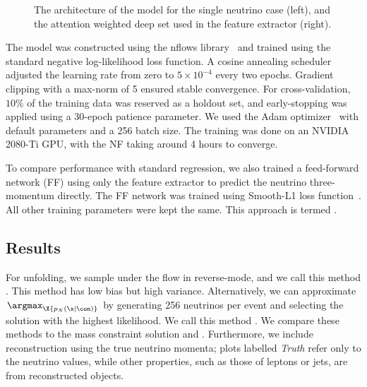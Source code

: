 \begin{figure}[ht]
    \centering
    \caption{The architecture of the \vflows model for the single neutrino case (left), and the attention weighted deep set used in the feature extractor (right).}
    \label{fig:flow}
\end{figure}

The model was constructed using the nflows library~\cite{nflows} and trained using the standard negative log-likelihood loss function.
A cosine annealing scheduler adjusted the learning rate from zero to $5\times 10^{-4}$ every two epochs.
Gradient clipping with a max-norm of 5 ensured stable convergence.
For cross-validation, $10\%$ of the training data was reserved as a holdout set, and early-stopping was applied using a 30-epoch patience parameter.
We used the Adam optimizer~\cite{Adam} with default parameters and a 256 batch size.
The training was done on an NVIDIA 2080-Ti GPU, with the NF taking around 4 hours to converge.

To compare performance with standard regression, we also trained a feed-forward network (FF) using only the feature extractor to predict the neutrino three-momentum directly.
The FF network was trained using Smooth-L1 loss function~\cite{SmoothL1}.
All other training parameters were kept the same.
This approach is termed \vff.

\subsection{Results}

For unfolding, we sample under the flow in reverse-mode, and we call this method \vsample.
This method has low bias but high variance.
Alternatively, we can approximate $\argmax_\X{p_X(\x|\con)}$ by generating 256 neutrinos per event and selecting the solution with the highest likelihood.
We call this method \vmode.
We compare these methods to the mass constraint solution and \vff.
Furthermore, we include reconstruction using the true neutrino momenta; plots labelled \emph{Truth} refer only to the neutrino values, while other properties, such as those of leptons or jets, are from reconstructed objects.


